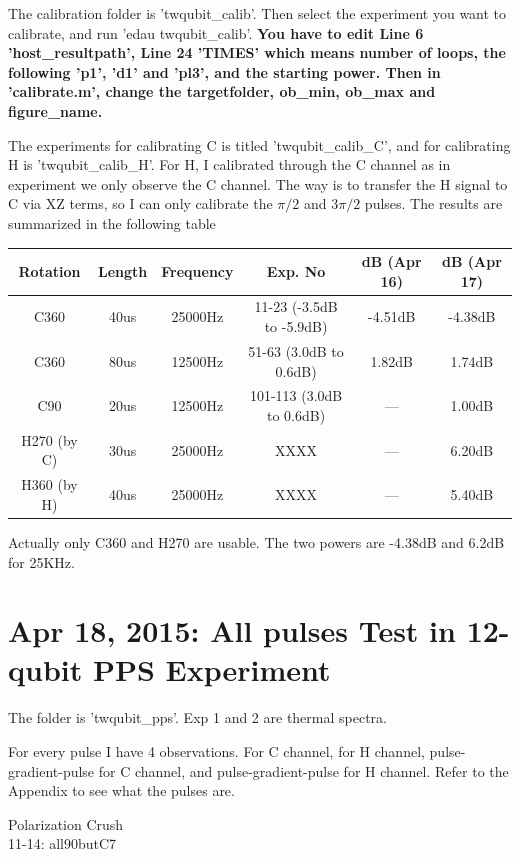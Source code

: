 \documentclass[prl,onecolumn]{revtex4-1}
\begin{document}
The calibration folder is 'twqubit\_calib'. Then select the experiment you want to calibrate, and run 'edau twqubit\_calib'. \textbf{You have to edit Line 6 'host\_resultpath', Line 24 'TIMES' which means number of loops, the following 'p1', 'd1' and 'pl3', and the starting power.  Then in 'calibrate.m', change the targetfolder, ob\_min, ob\_max and figure\_name. }

The experiments for calibrating C is titled 'twqubit\_calib\_C', and for calibrating H is 'twqubit\_calib\_H'. For H, I calibrated through the C channel as in experiment we only observe the C channel. The way is to transfer the H signal to C via XZ terms, so I can only calibrate the $\pi/2$ and $3\pi/2$ pulses. The results are summarized in the following table
\begin{table}[hbtp]
\begin{tabular} {c||c|c|c|c|c}
  \hline
  Rotation & Length & Frequency & Exp. No & dB (Apr 16) & dB (Apr 17)\\
  \hline
  C360 & 40us & 25000Hz & 11-23 (-3.5dB to -5.9dB) & -4.51dB & -4.38dB\\
  C360 & 80us & 12500Hz & 51-63 (3.0dB to 0.6dB) & 1.82dB & 1.74dB\\
  C90 & 20us & 12500Hz & 101-113 (3.0dB to 0.6dB) & --- & 1.00dB\\
  H270 (by C) & 30us & 25000Hz & XXXX & --- & 6.20dB\\
  H360 (by H) & 40us & 25000Hz & XXXX & --- & 5.40dB\\
  \hline
\end{tabular}
\end{table}

Actually only C360 and H270 are usable. The two powers are -4.38dB and 6.2dB for 25KHz.

\newpage
\section{Apr 18, 2015: All pulses Test in 12-qubit PPS Experiment}

The folder is 'twqubit\_pps'. Exp 1 and 2 are thermal spectra.

For every pulse I have 4 observations. For C channel, for H channel, pulse-gradient-pulse for C channel, and pulse-gradient-pulse for H channel. Refer to the Appendix to see what the pulses are.

Polarization Crush \\
11-14: all90butC7
\end{document}
